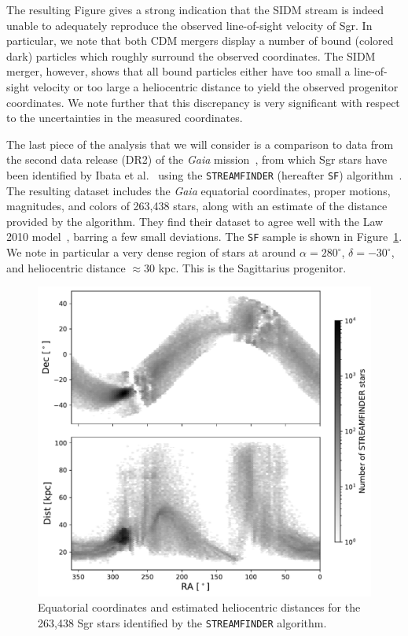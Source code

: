 The resulting Figure gives a strong indication that the SIDM stream is indeed
unable to adequately reproduce the observed line-of-sight velocity of Sgr. In
particular, we note that both CDM mergers display a number of bound (colored
dark) particles which roughly surround the observed coordinates.  The SIDM
merger, however, shows that all bound particles either have too small a
line-of-sight velocity or too large a heliocentric distance to yield the
observed progenitor coordinates. We note further that this discrepancy is very
significant with respect to the uncertainties in the measured coordinates.


The last piece of the analysis that we will consider is a comparison to data
from the second data release (DR2) of the \textit{Gaia}
mission~\cite{lindegren_gaia_2018,gaia_collaboration_gaia_2018}, from which Sgr
stars have been identified by Ibata et al.~\cite{ibata_panoramic_2020} using the
\verb|STREAMFINDER| (hereafter \verb|SF|)
algorithm~\cite{malhan_streamfinder_2018, malhan_ghostly_2018}.  The resulting
dataset includes the \textit{Gaia} equatorial coordinates, proper motions,
magnitudes, and colors of 263,438 stars, along with an estimate of the
distance provided by the algorithm.  They find their dataset to agree well
with the Law 2010 model~\cite{law_sagittarius_2010}, barring a few small
deviations.  The \verb|SF| sample is shown in
Figure~\ref{fig:streamfinder}.  We note in particular a very dense region of
stars at around $\alpha = 280^\circ$, $\delta = -30^\circ$, and heliocentric
distance $\approx 30$ kpc.  This is the Sagittarius progenitor.

\begin{figure}
    \centering 
    \includegraphics[width=0.7\linewidth]{figs/streamfinder.pdf}
    \caption{%
        Equatorial coordinates and estimated heliocentric distances for the
        263,438 Sgr stars identified by the \texttt{STREAMFINDER} algorithm.
    }
    \label{fig:streamfinder}
\end{figure}

